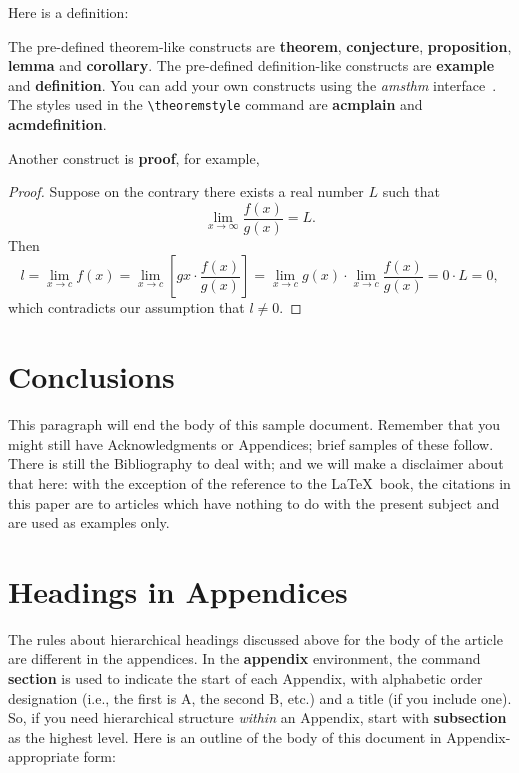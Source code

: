 Here is a definition:


The pre-defined theorem-like constructs are \textbf{theorem},
\textbf{conjecture}, \textbf{proposition}, \textbf{lemma} and
\textbf{corollary}.  The pre-defined de\-fi\-ni\-ti\-on-like constructs are
\textbf{example} and \textbf{definition}.  You can add your own
constructs using the \textsl{amsthm} interface~\cite{Amsthm15}.  The
styles used in the \verb|\theoremstyle| command are \textbf{acmplain}
and \textbf{acmdefinition}.

Another construct is \textbf{proof}, for example,

\begin{proof}
  Suppose on the contrary there exists a real number $L$ such that
  \begin{displaymath}
    \lim_{x\rightarrow\infty} \frac{f(x)}{g(x)} = L.
  \end{displaymath}
  Then
  \begin{displaymath}
    l=\lim_{x\rightarrow c} f(x)
    = \lim_{x\rightarrow c}
    \left[ g{x} \cdot \frac{f(x)}{g(x)} \right ]
    = \lim_{x\rightarrow c} g(x) \cdot \lim_{x\rightarrow c}
    \frac{f(x)}{g(x)} = 0\cdot L = 0,
  \end{displaymath}
  which contradicts our assumption that $l\neq 0$.
\end{proof}

\section{Conclusions}
This paragraph will end the body of this sample document.
Remember that you might still have Acknowledgments or
Appendices; brief samples of these
follow.  There is still the Bibliography to deal with; and
we will make a disclaimer about that here: with the exception
of the reference to the \LaTeX\ book, the citations in
this paper are to articles which have nothing to
do with the present subject and are used as
examples only.



\appendix
\section{Headings in Appendices}
The rules about hierarchical headings discussed above for
the body of the article are different in the appendices.
In the \textbf{appendix} environment, the command
\textbf{section} is used to
indicate the start of each Appendix, with alphabetic order
designation (i.e., the first is A, the second B, etc.) and
a title (if you include one).  So, if you need
hierarchical structure
\textit{within} an Appendix, start with \textbf{subsection} as the
highest level. Here is an outline of the body of this
document in Appendix-appropriate form:
